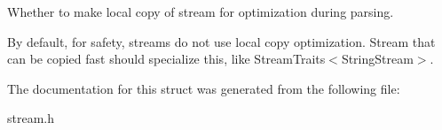 Whether to make local copy of stream for optimization during parsing. 

By default, for safety, streams do not use local copy optimization. Stream that can be copied fast should specialize this, like Stream\+Traits$<$\+String\+Stream$>$. 

The documentation for this struct was generated from the following file\+:\begin{DoxyCompactItemize}
\item 
stream.\+h\end{DoxyCompactItemize}
